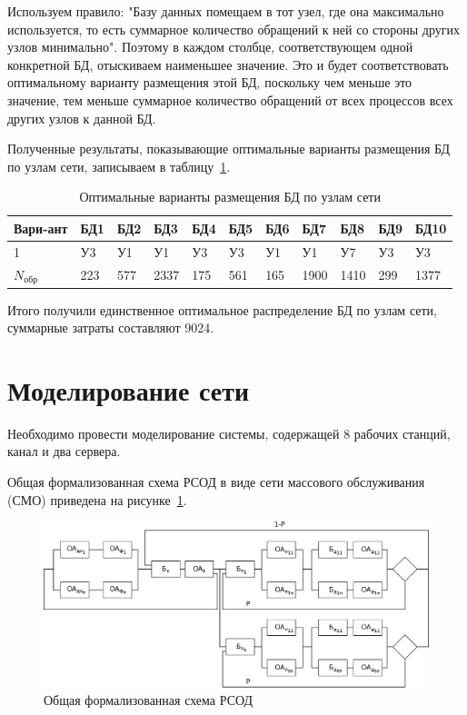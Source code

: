 \documentclass[russian,utf8,emptystyle]{eskdtext}
\begin{document}
Используем правило: "Базу данных помещаем в тот узел, где она максимально используется, то есть суммарное количество обращений к ней со стороны других узлов минимально". Поэтому в каждом столбце, соответствующем одной конкретной БД, отыскиваем наименьшее значение. Это и будет соответствовать оптимальному варианту размещения этой БД, поскольку чем меньше это значение, тем меньше суммарное количество обращений от всех процессов всех других узлов к данной БД.

Полученные результаты, показывающие оптимальные варианты размещения БД по узлам сети, записываем в таблицу~\ref{tab:bd-5}.

\begin{longtable}{p{1.1cm}|p{1cm}|p{1cm}|p{1cm}|p{1cm}|p{1cm}|p{1cm}|p{1cm}|p{1cm}|p{1cm}|p{1cm}}
\caption{Оптимальные варианты размещения БД по узлам сети}
\label{tab:bd-5} \\
Вари-ант&  БД1 &  БД2 &  БД3 &  БД4 &  БД5 &  БД6 &  БД7 &  БД8 &  БД9 &  БД10 \\
\hline
1       & У3   & У1   & У1   & У3   & У3   & У1   & У1   & У7   & У3   & У3    \\
\hline\hline
$N_\text{обр}$    
        & 223  & 577  & 2337 & 175  & 561  & 165  & 1900 & 1410 & 299  & 1377  \\
\end{longtable}

Итого получили единственное оптимальное распределение БД по узлам сети, суммарные затраты составляют 9024.

\clearpage
\section{Моделирование сети}
Необходимо провести моделирование системы, содержащей 8 рабочих станций, канал и два сервера. 

Общая формализованная схема РСОД в виде сети массового обслуживания (СМО) приведена на рисунке~\ref{fig:anal-1}.

\begin{figure}[h!]
\centering
\includegraphics[width=1.0\textwidth]{anal1}
\caption{Общая формализованная схема РСОД}
\label{fig:anal-1}
\end{figure}
\end{document}
